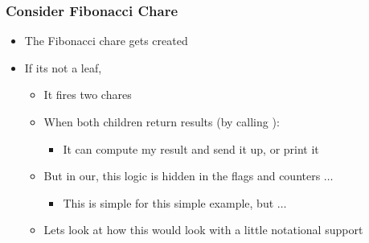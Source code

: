 \documentclass{beamer}
\begin{document}
\begin{frame}
  \frametitle{Consider Fibonacci Chare}
  \begin{itemize}
  \item The Fibonacci chare gets created
  \item If its not a leaf,
    \begin{itemize}
    \item It fires two chares
    \item When both children return results (by calling ):
      \begin{itemize}
      \item It can compute my result and send it up, or print it
      \end{itemize}
    \item But in our, this logic is hidden in the flags and counters $\ldots$
      \begin{itemize}
      \item This is simple for this simple example, but $\ldots$
      \end{itemize}
    \item Lets look at how this would look with a little notational support
    \end{itemize}
  \end{itemize}
\end{frame}

\end{document}
